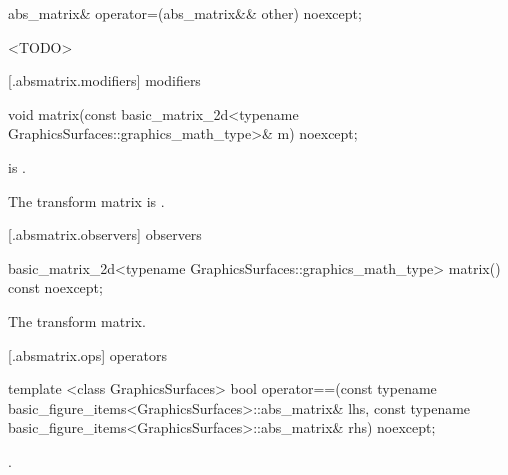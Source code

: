 %
\begin{itemdecl}
abs_matrix& operator=(abs_matrix&& other) noexcept;
\end{itemdecl}
\begin{itemdescr}
\pnum
\effects
<TODO>

\pnum
\returns
{}
\end{itemdescr}

 [\iotwod.absmatrix.modifiers]{ modifiers}

%
\begin{itemdecl}
void matrix(const basic_matrix_2d<typename GraphicsSurfaces::graphics_math_type>& m) noexcept;
\end{itemdecl}
\begin{itemdescr}
\pnum
\requires
{} is .

\pnum
\effects
The transform matrix is .
\end{itemdescr}

 [\iotwod.absmatrix.observers]{ observers}

%
\begin{itemdecl}
basic_matrix_2d<typename GraphicsSurfaces::graphics_math_type> matrix() const noexcept;
\end{itemdecl}
\begin{itemdescr}
\pnum
\returns
The transform matrix.
\end{itemdescr}

 [\iotwod.absmatrix.ops]{ operators}

%
\begin{itemdecl}
template <class GraphicsSurfaces>
bool operator==(const typename basic_figure_items<GraphicsSurfaces>::abs_matrix& lhs,
  const typename basic_figure_items<GraphicsSurfaces>::abs_matrix& rhs) noexcept;
\end{itemdecl}
\begin{itemdescr}
\pnum
\returns
{}.
\end{itemdescr}
